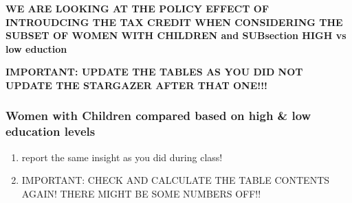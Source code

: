 \documentclass[a4paper]{article}
\begin{document}
\textbf{WE ARE LOOKING AT THE POLICY EFFECT OF INTROUDCING THE TAX CREDIT WHEN CONSIDERING THE SUBSET OF WOMEN WITH CHILDREN and SUBsection HIGH vs low eduction}


\textbf{IMPORTANT: UPDATE THE TABLES AS YOU DID NOT UPDATE THE STARGAZER AFTER THAT ONE!!!}


\subsubsection{Women with Children compared based on high \& low education levels}

\begin{enumerate}
   \item report the same insight as you did during class! 
   \item IMPORTANT: CHECK AND CALCULATE THE TABLE CONTENTS AGAIN! THERE MIGHT BE SOME NUMBERS OFF!!
\end{enumerate}
\end{document}
